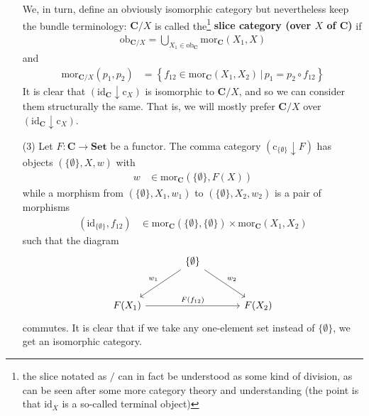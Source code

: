 \begin{enumerate}
We, in turn, define an obviously isomorphic category but nevertheless keep the bundle terminology: $\mathbf{C} \slash X$ is called the\footnote{the slice notated as $\slash$ can in fact be understood as some kind of division, as can be seen after some more category theory and understanding \cite{c55c71e8} (the point is that $\mathrm{id}_{X}$ is a so-called terminal object)} \textbf{slice category (over $X$ of $\mathbf{C}$)} if
\begin{align*}
  \mathrm{ob}_{\mathbf{C} \slash X}
  =
  \bigcup_{X_{1} \in \mathrm{ob}_{\mathbf{C}}}
  \mathrm{mor}_{\mathbf{C}}(X_{1},X)
\end{align*}
and
\begin{align*}
  \mathrm{mor}_{\mathbf{C} \slash X}(p_{1},p_{2})
  &=
  \left\lbrace
      f_{12}
      \in
      \mathrm{mor}_{\mathbf{C}}(X_{1},X_{2})
    \,
    \vert
    \,
      p_{1}
      =
      p_{2}
      \circ
      f_{12}
  \right\rbrace
\end{align*}
It is clear that $(\mathrm{id}_{\mathbf{C}} \downarrow \mathrm{c}_{X})$ is isomorphic to $\mathbf{C} \slash X$, and so we can consider them structurally the same.
That is, we will mostly prefer $\mathbf{C} \slash X$ over $(\mathrm{id}_{\mathbf{C}} \downarrow \mathrm{c}_{X})$.
\item[(3)]
Let $F \colon \mathbf{C} \rightarrow \mathbf{Set}$ be a functor.
The comma category $(\mathrm{c}_{\lbrace \emptyset \rbrace} \downarrow F)$ has objects $(\lbrace \emptyset \rbrace,X,w)$ with
\begin{align*}
  w
  &\in
  \mathrm{mor}_{\mathbf{C}}(\lbrace \emptyset \rbrace,F(X))
\end{align*}
while a morphism from $(\lbrace \emptyset \rbrace,X_{1},w_{1})$ to $(\lbrace \emptyset \rbrace,X_{2},w_{2})$ is a pair of morphisms
\begin{align*}
  (\mathrm{id}_{\lbrace \emptyset \rbrace},f_{12})
  &\in
  \mathrm{mor}_{\mathbf{C}}(\lbrace \emptyset \rbrace,\lbrace \emptyset \rbrace)
  \times
  \mathrm{mor}_{\mathbf{C}}(X_{1},X_{2})
\end{align*}
such that the diagram
\[
\begin{tikzcd}[sep=large]
  &
  \lbrace
    \emptyset
  \rbrace
  \arrow[swap]{dl}{w_{1}}
  \arrow{dr}{w_{2}}
  &
  \\
  F(X_{1})
  \arrow{rr}{F(f_{12})}
  &
  &
  F(X_{2})
\end{tikzcd}
\]
commutes.
It is clear that if we take any one-element set instead of $\lbrace \emptyset \rbrace$, we get an isomorphic category.

\end{enumerate}
